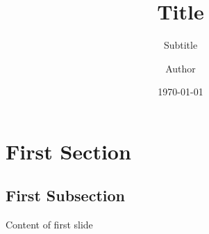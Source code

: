 \documentclass[
	aspectratio=169, %
	8pt, %
	nosectionframes, %
]{beamer}
\title[Short Title]{Title} %
\subtitle[Short Subtitle]{Subtitle} %
\author[Short Author]{Author} %
\date{\today} %
\begin{document}
\maketitle[iz][400] %

\section{First Section}

\subsection{First Subsection}
\begin{frame}{\insertsubsection}
    Content of first slide
\end{frame}

\againtitle

\contentoverview %
\end{document}
